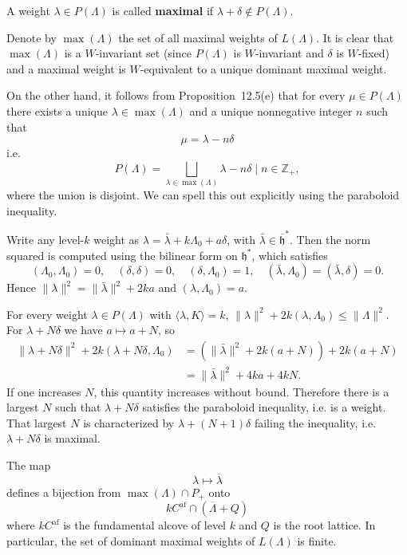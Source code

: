 \documentclass[12pt]{article}
\begin{document}
\begin{definition}
    A weight $\lambda \in P(\Lambda)$ is called \textbf{maximal} if $\lambda + \delta \notin P(\Lambda)$.
\end{definition}
Denote by $\operatorname{max}(\Lambda)$ the set of all maximal weights of $L(\Lambda)$. It is clear that $\operatorname{max}(\Lambda)$ is a $W$-invariant set (since $P(\Lambda)$ is $W$-invariant and $\delta$ is $W$-fixed) and a maximal weight is $W$-equivalent to a unique dominant maximal weight.

On the other hand, it follows from Proposition~12.5(e) that for every $\mu \in P(\Lambda)$ there exists a unique $\lambda \in \operatorname{max}(\Lambda)$ and a unique nonnegative integer $n$ such that
\[\mu = \lambda - n\delta\]
i.e.
\begin{equation}
    P(\Lambda) = \bigsqcup_{\lambda \in \operatorname{max}(\Lambda)} {\lambda - n\delta \mid n \in \mathbb{Z}_+},
    \label{eq:12.6.1}
\end{equation}
where the union is disjoint. We can spell this out explicitly using the paraboloid inequality.

Write any level-$k$ weight as $\lambda=\bar\lambda+k\Lambda_0+a\delta$, with $\bar\lambda\in\overline{\mathfrak h}^*$.
Then the norm squared is computed using the bilinear form on $\mathfrak{h}^*$, which satisfies
\[(\Lambda_0,\Lambda_0)=0, \quad (\delta,\delta)=0, \quad (\delta,\Lambda_0)=1, \quad (\bar\lambda,\Lambda_0)=(\bar\lambda,\delta)=0.\]
Hence $\|\lambda\|^2=\|\bar\lambda\|^2+2ka$ and $(\lambda,\Lambda_0)=a$.

For every weight $\lambda\in P(\Lambda)$ with $\langle\lambda,K\rangle=k$,
$\|\lambda\|^2+2k(\lambda,\Lambda_0)\le\|\Lambda\|^2$.
For $\lambda+N\delta$ we have $a\mapsto a+N$, so
\begin{align*}
    \|\lambda+N\delta\|^2+2k(\lambda+N\delta,\Lambda_0)
     & = (\|\bar\lambda\|^2+2k(a+N)) + 2k(a+N) \\
     & = \|\bar\lambda\|^2+4k a + 4kN.
\end{align*}
If one increases $N$, this quantity increases without bound. Therefore there is a largest $N$ such that $\lambda+N\delta$ satisfies the paraboloid inequality, i.e. is a weight. That largest $N$ is characterized by $\lambda+(N+1)\delta$ failing the inequality, i.e. $\lambda+N\delta$ is maximal.

\begin{proposition}[12.6]
    The map
    \[
        \lambda \longmapsto \overline{\lambda}
    \]
    defines a bijection from $\operatorname{max}(\Lambda) \cap P_+$ onto
    \[kC^{\mathrm{af}} \cap (\overline{\Lambda} + Q)\]
    where $kC^{\mathrm{af}}$ is the fundamental alcove of level $k$ and $Q$ is the root lattice. In particular, the set of dominant maximal weights of $L(\Lambda)$ is finite.
\end{proposition}
\end{document}

